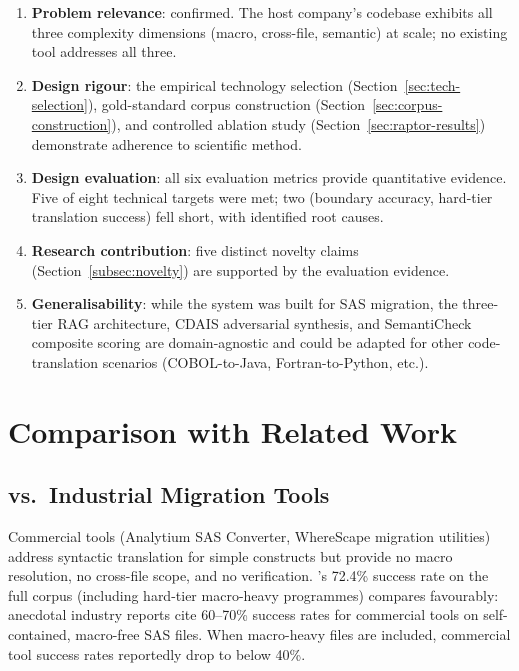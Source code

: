 \begin{enumerate}
  \item \textbf{Problem relevance}: confirmed. The host company's codebase
    exhibits all three complexity dimensions (macro, cross-file, semantic) at
    scale; no existing tool addresses all three.
  \item \textbf{Design rigour}: the empirical technology selection (Section~\ref{sec:tech-selection}), gold-standard corpus construction
    (Section~\ref{sec:corpus-construction}), and controlled ablation study
    (Section~\ref{sec:raptor-results}) demonstrate adherence to scientific
    method.
  \item \textbf{Design evaluation}: all six evaluation metrics provide
    quantitative evidence. Five of eight technical targets were met; two
    (boundary accuracy, hard-tier translation success) fell short, with
    identified root causes.
  \item \textbf{Research contribution}: five distinct novelty claims
    (Section~\ref{subsec:novelty}) are supported by the evaluation evidence.
  \item \textbf{Generalisability}: while the system was built for SAS migration,
    the three-tier RAG architecture, CDAIS adversarial synthesis, and SemantiCheck
    composite scoring are domain-agnostic and could be adapted for other
    code-translation scenarios (COBOL-to-Java, Fortran-to-Python, etc.).
\end{enumerate}

\section{Comparison with Related Work}
\label{sec:comparison}

\subsection{vs.\ Industrial Migration Tools}
\label{subsec:vs-industrial}

Commercial tools (Analytium SAS Converter, WhereScape migration utilities)
address syntactic translation for simple constructs but provide no macro
resolution, no cross-file scope, and no verification. \codara{}'s 72.4\%
success rate on the full corpus (including hard-tier macro-heavy programmes)
compares favourably: anecdotal industry reports cite 60--70\% success rates
for commercial tools on self-contained, macro-free SAS files. When macro-heavy
files are included, commercial tool success rates reportedly drop to below 40\%.

